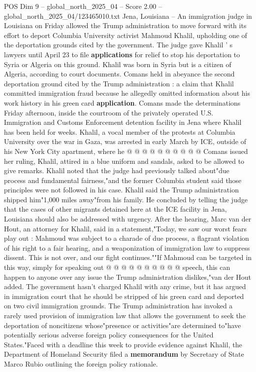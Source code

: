 \begin{textsample}{POS Dim 9 – global\_north\_2025\_04 – Score 2.00 – global\_north\_2025\_04/123465010.txt}  \label{ex:f9_pos_317}
Jena, Louisiana -- An immigration judge in Louisiana on Friday allowed the Trump administration to move forward with its effort to deport Columbia University activist Mahmoud Khalil, upholding one of the deportation grounds cited by the government.
The judge gave Khalil ' s lawyers until April 23 to file \textbf{applications} for relief to stop his deportation to Syria or Algeria on this ground.
Khalil was born in Syria but is a citizen of Algeria, according to court documents.
Comans held in abeyance the second deportation ground cited by the Trump administration : a claim that Khalil committed immigration fraud because he allegedly omitted information about his work history in his green card \textbf{application}.
Comans made the determinations Friday afternoon, inside the courtroom of the privately operated U.S.
Immigration and Customs Enforcement detention facility in Jena where Khalil has been held for weeks.
Khalil, a vocal member of the protests at Columbia University over the war in Gaza, was arrested in early March by ICE, outside of his New York City apartment, where he @ @ @ @ @ @ @ @ @ @ Comans issued her ruling, Khalil, attired in a blue uniform and sandals, asked to be allowed to give remarks.
Khalil noted that the judge had previously talked about"due process and fundamental fairness,"and the former Columbia student said those principles were not followed in his case.
Khalil said the Trump administration shipped him"1,000 miles away"from his family.
He concluded by telling the judge that the cases of other migrants detained here at the ICE facility in Jena, Louisiana should also be addressed with urgency.
After the hearing, Marc van der Hout, an attorney for Khalil, said in a statement,"Today, we saw our worst fears play out : Mahmoud was subject to a charade of due process, a flagrant violation of his right to a fair hearing, and a weaponization of immigration law to suppress dissent.
This is not over, and our fight continues.""If Mahmoud can be targeted in this way, simply for speaking out @ @ @ @ @ @ @ @ @ @ speech, this can happen to anyone over any issue the Trump administration dislikes,"van der Hout added.
The government hasn't charged Khalil with any crime, but it has argued in immigration court that he should be stripped of his green card and deported on two civil immigration grounds.
The Trump administration has invoked a rarely used provision of immigration law that allows the government to seek the deportation of noncitizens whose"presence or activities"are determined to"have potentially serious adverse foreign policy consequences for the United States."Faced with a deadline this week to provide evidence against Khalil, the Department of Homeland Security filed a \textbf{memorandum} by Secretary of State Marco Rubio outlining the foreign policy rationale.

\end{textsample}
